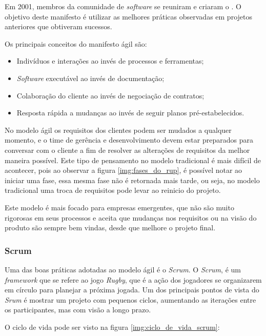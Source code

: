 Em 2001, membros da comunidade de \textit{software} se reuniram e criaram o . O objetivo deste manifesto é utilizar as melhores práticas observadas em projetos anteriores que obtiveram sucessos.

Os principais conceitos do manifesto ágil são:

\begin{itemize}
	\item Indivíduos e interações ao invés de processos e ferramentas;
	\item \textit{Software} executável ao invés de documentação;
	\item Colaboração do cliente ao invés de negociação de contratos;
	\item Resposta rápida a mudanças ao invés de seguir planos pré-estabelecidos.
\end{itemize}

No modelo ágil os requisitos dos clientes podem ser mudados a qualquer momento, e o time de gerência e desenvolvimento devem estar preparados para conversar com o cliente a fim de resolver as alterações de requisitos da melhor maneira possível. Este tipo de pensamento no modelo tradicional é mais difícil de acontecer, pois ao observar a figura \ref{img:fases_do_rup}, é possível notar ao iniciar uma fase, essa mesma fase não é retornada mais tarde, ou seja, no modelo tradicional uma troca de requisitos pode levar ao reinicio do projeto.

Este modelo é mais focado para empresas emergentes, que não são muito rigorosas em seus processos e aceita que mudanças nos requisitos ou na visão do produto são sempre bem vindas, desde que melhore o projeto final.

\subsubsection{Scrum}
\label{sec:scrum}

Uma das boas práticas adotadas ao modelo ágil é o \textit{Scrum}. O \textit{Scrum}, é um \textit{framework} que se refere ao jogo \textit{Rugby}, que é a ação dos jogadores se organizarem em círculo para planejar a próxima jogada. Um dos principais pontos de vista do \textit{Srum} é mostrar um projeto com pequenos ciclos, aumentando as iterações entre os participantes, mas com visão a longo prazo.

O ciclo de vida pode ser visto na figura \ref{img:ciclo_de_vida_scrum}:

